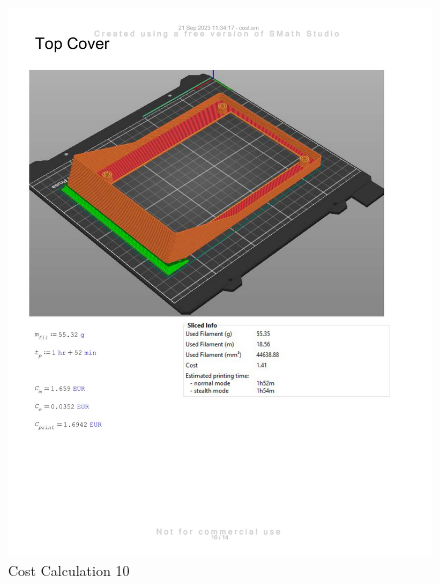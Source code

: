 \begin{figure}[H]
    \centering
    \includegraphics[width=\linewidth]{texs/appendix/data/cost1-10.jpg}
    \caption{Cost Calculation 10}
    \label{fig:cost-calculation-10}
\end{figure}

